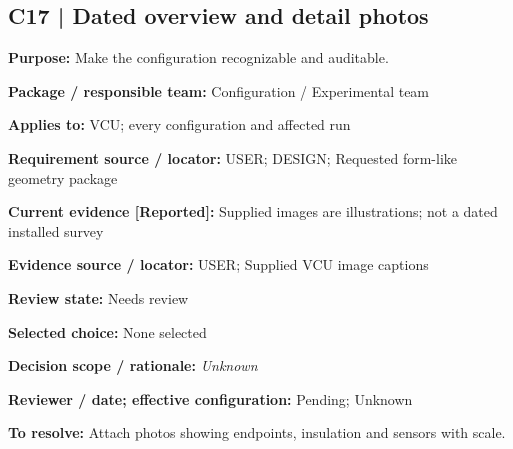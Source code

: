 \documentclass[11pt]{article}
\begin{document}
\par\noindent\begin{minipage}{\textwidth}\small\setlength{\parskip}{2pt}
\subsection*{C17 | Dated overview and detail photos}
\textbf{Purpose:} Make the configuration recognizable and auditable.\par
\textbf{Package / responsible team:} Configuration / Experimental team\par
\textbf{Applies to:} VCU; every configuration and affected run\par
\textbf{Requirement source / locator:} USER; DESIGN; Requested form-like geometry package\par
\textbf{Current evidence [Reported]:} Supplied images are illustrations; not a dated installed survey\par
\textbf{Evidence source / locator:} USER; Supplied VCU image captions\par
\textbf{Review state:} Needs review\par
\textbf{Selected choice:} None selected\par
\textbf{Decision scope / rationale:} \textit{Unknown}\par
\textbf{Reviewer / date; effective configuration:} Pending; Unknown\par
\textbf{To resolve:} Attach photos showing endpoints, insulation and sensors with scale.\par
\end{minipage}\par\vspace{5pt}
\end{document}
